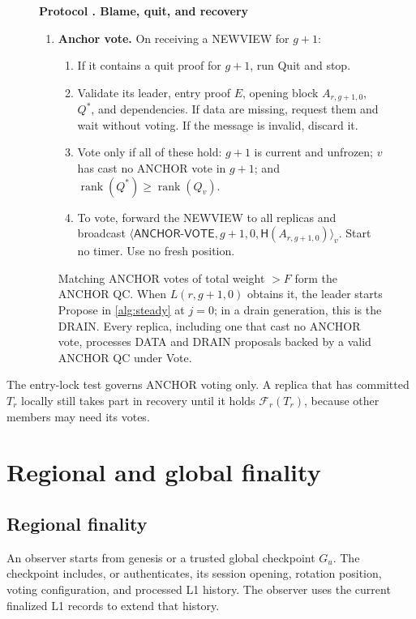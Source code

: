 \documentclass[11pt,a4paper]{article}
\newcommand{\RR}[1]{{\color{rrRed}#1}}
\newcommand{\FC}{\mathcal F}
\newcommand{\Hash}{\mathsf H}
\newcommand{\rank}{\operatorname{rank}}
\newcommand{\tagg}[1]{\ensuremath{\mathsf{#1}}}
\newcounter{protocol}
\newenvironment{protocol}[2]{\begin{figure}[htbp]\refstepcounter{protocol}\label{#1}
\begin{mdframed}[linewidth=.6pt,skipabove=0pt,skipbelow=0pt,
innertopmargin=7pt,innerbottommargin=7pt]\small
\textbf{Protocol \theprotocol. #2}\par\smallskip}{\end{mdframed}\end{figure}}
\begin{document}
\begin{protocol}{alg:recovery}{Blame, quit, and recovery}
\begin{enumerate}[label=\textbf{\arabic*)},itemsep=3pt]
\item \textbf{Anchor vote.} On receiving a NEWVIEW for $g+1$:
 \begin{enumerate}[label=(\alph*)]
 \item If it contains a quit proof for $g+1$, run Quit and stop.
 \item Validate its leader, entry proof $E$, opening block $A_{r,g+1,0}$,
       $Q^*$, and dependencies. If data are missing, request them and
       wait without voting. If the message is invalid, discard it.
 \item Vote only if all of these hold: $g+1$ is current and unfrozen; $v$
       has cast no ANCHOR vote in $g+1$; and $\rank(Q^*)\ge\rank(Q_v)$.
 \item To vote, forward the NEWVIEW to all replicas and broadcast
       $\langle\tagg{ANCHOR\mbox{-}VOTE},g+1,0,\Hash(A_{r,g+1,0})\rangle_v$.
       Start no timer. Use no fresh position.
 \end{enumerate}
 Matching ANCHOR votes \RR{of total weight $>F$} form the ANCHOR QC.
 When $L(r,g+1,0)$ obtains it, the leader starts Propose in
 \cref{alg:steady} at $j=0$\RR{; in a drain generation, this is the
 DRAIN}. Every replica, including one that cast no ANCHOR vote,
 processes DATA \RR{and DRAIN} proposals backed by a valid ANCHOR QC
 under Vote.
\end{enumerate}
\end{protocol}

The entry-lock test governs ANCHOR voting only. A replica that has
committed $T_r$ locally still takes part in recovery until it holds
$\FC_r(T_r)$, because other members may need its votes.

\section{Regional and global finality}
\label{sec:external}

\subsection{Regional finality}
\label{sec:regional-finality}
An observer starts from genesis or a trusted global checkpoint $G_u$.
The checkpoint includes, or authenticates, its session opening, rotation
position, voting configuration, and processed L1 history. The observer
uses the current finalized L1 records to extend that history.
\end{document}

